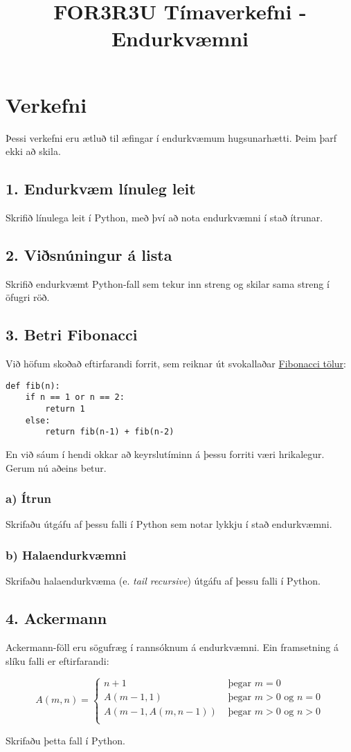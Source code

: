 \documentclass{article}
\title{FOR3R3U Tímaverkefni - Endurkvæmni}
\begin{document}
\maketitle

\section{Verkefni}
Þessi verkefni eru ætluð til æfingar í endurkvæmum hugsunarhætti. Þeim þarf ekki að skila.
\subsection{1. Endurkvæm línuleg leit}
Skrifið línulega leit í Python, með því að nota endurkvæmni í stað ítrunar.
\subsection{2. Viðsnúningur á lista}
Skrifið endurkvæmt Python-fall sem tekur inn streng og skilar sama streng í öfugri röð.
\subsection{3. Betri Fibonacci}
Við höfum skoðað eftirfarandi forrit, sem reiknar út svokallaðar \href{http://en.wikipedia.org/wiki/Fibonacci_number}{Fibonacci tölur}:

\begin{verbatim}
def fib(n):
    if n == 1 or n == 2:
        return 1
    else:
        return fib(n-1) + fib(n-2)
\end{verbatim}

En við sáum í hendi okkar að keyrslutíminn á þessu forriti væri hrikalegur. Gerum nú aðeins betur.

\subsubsection{a) Ítrun}
Skrifaðu útgáfu af þessu falli í Python sem notar lykkju í stað endurkvæmni.

\subsubsection{b) Halaendurkvæmni}
Skrifaðu halaendurkvæma (e. \emph{tail recursive}) útgáfu af þessu falli í Python.

\subsection{4. Ackermann}
Ackermann-föll eru sögufræg í rannsóknum á endurkvæmni. Ein framsetning á slíku falli er eftirfarandi: 

\[
 A(m,n) = \left\{
 \begin{array}{ll}
 n+1&\text{ þegar }m = 0\\
 A(m-1,1)&\text{ þegar }m > 0 \text{ og } n = 0\\
 A(m-1,A(m,n-1))&\text{ þegar }m>0 \text{ og } n > 0\\
 \end{array}
 \right.
\]

Skrifaðu þetta fall í Python.
\end{document}

